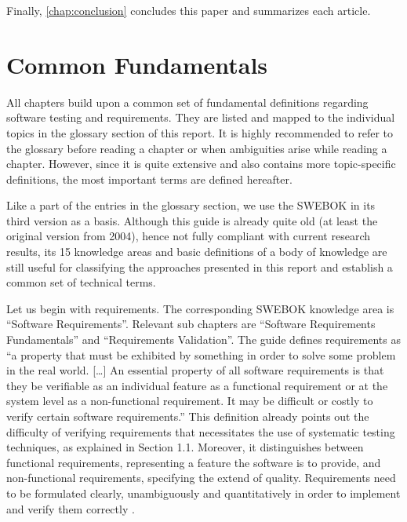 Finally, \autoref{chap:conclusion} concludes this paper and summarizes each article.

\section{Common Fundamentals}\label{sec:introduction_common_fundamentals}
All chapters build upon a common set of fundamental definitions regarding software testing and requirements.
They are listed and mapped to the individual topics in the glossary section of this report.
It is highly recommended to refer to the glossary before reading a chapter or when ambiguities arise while reading a chapter.
However, since it is quite extensive and also contains more topic-specific definitions, the most important terms are defined hereafter.

Like a part of the entries in the glossary section, we use the SWEBOK in its third version as a basis.
Although this guide is already quite old (at least the original version from 2004), hence not fully compliant with current research results, its 15 knowledge areas and basic definitions of a body of knowledge are still useful for classifying the approaches presented in this report and establish a common set of technical terms.

Let us begin with requirements.
The corresponding SWEBOK knowledge area is \enquote{Software Requirements}.
Relevant sub chapters are \enquote{Software Requirements Fundamentals} and \enquote{Requirements Validation}.
The guide defines requirements as \enquote{a property that must be exhibited by something in order to solve some problem in the real world. [\ldots]
An essential property of all software requirements is that they be verifiable as an individual feature as a functional requirement or at the system level as a non-functional requirement.
It may be difficult or costly to verify certain software requirements.} \cite{SWEBOK}
This definition already points out the difficulty of verifying requirements that necessitates the use of systematic testing techniques, as explained in Section 1.1.
Moreover, it distinguishes between functional requirements, representing a feature the software is to provide, and non-functional requirements, specifying the extend of quality.
Requirements need to be formulated clearly, unambiguously and quantitatively in order to implement and verify them correctly \cite{SWEBOK}.

